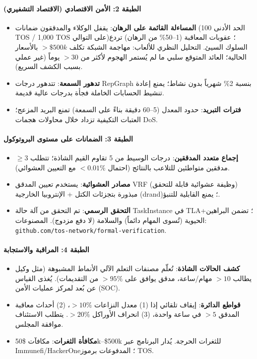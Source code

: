 \documentclass[11pt]{article}
\begin{document}
\paragraph{الطبقة 2: الأمن الاقتصادي (الاقتصاد التشفيري)}
\begin{itemize}[noitemsep]
  \item \textbf{المساءلة القائمة على الرهان}: يقفل الوكلاء والمدققون ضمانات (الحد الأدنى 100 TOS / 1,000 TOS على التوالي)؛ عقوبات المعاقبة (1--50\% من الرهان) تردع السلوك السيئ. التحليل النظري للألعاب: مهاجمة الشبكة تكلف $>\$500k$ بالأسعار الحالية؛ العائد المتوقع سلبي ما لم يُستمر الهجوم لأكثر من $>30$ يوماً (غير عملي بسبب الكشف السريع).
  \item \textbf{تدهور السمعة}: تتدهور درجات RepGraph بنسبة 2\% شهرياً بدون نشاط؛ يمنع إعادة تنشيط الحسابات الخاملة فجأة بدرجات عالية قديمة.
  \item \textbf{فترات التبريد}: حدود المعدل (5--60 دقيقة بناءً على السمعة) تمنع البريد المزعج؛ العتبات التكيفية تزداد خلال محاولات هجمات DoS.
\end{itemize}

\paragraph{الطبقة 3: الضمانات على مستوى البروتوكول}
\begin{itemize}[noitemsep]
  \item \textbf{إجماع متعدد المدققين}: درجات الوسيط من 5 تقاوم القيم الشاذة؛ تتطلب $\geq3$ مدققين متواطئين للتلاعب بالنتائج (احتمال $<0.01\%$ مع التعيين العشوائي).
  \item \textbf{مصادر العشوائية}: يستخدم تعيين المدقق VRF (وظيفة عشوائية قابلة للتحقق) مبذورة بتجزئات الكتل + الإنتروبيا الخارجية (drand)؛ يمنع القابلية للتنبؤ.
  \item \textbf{التحقق الرسمي}: تم التحقق من آلة حالة TaskInstance في TLA+؛ تضمن البراهين الحيوية (تُسوى المهام دائماً) والسلامة (لا دفع مزدوج). المصنوعات: \texttt{github.com/tos-network/formal-verification}.
\end{itemize}

\paragraph{الطبقة 4: المراقبة والاستجابة}
\begin{itemize}[noitemsep]
  \item \textbf{كشف الحالات الشاذة}: تُعلّم مصنفات التعلم الآلي الأنماط المشبوهة (مثل وكيل يطالب $>10$ مهام/ساعة، مدقق يوافق على $>95\%$ من التقديمات). يُغذى القياس عن بُعد لمركز عمليات الأمن (SOC).
  \item \textbf{قواطع الدائرة}: إيقاف تلقائي إذا (1) معدل النزاعات $>10\%$، (2) أحداث معاقبة المدقق $>5$ في ساعة واحدة، (3) انحراف الأوراكل $>20\%$. يتطلب الاستئناف موافقة المجلس.
  \item \textbf{مكافأة الثغرات}: مكافآت \$50k--\$500k للثغرات الحرجة. يُدار البرنامج عبر Immunefi/HackerOne؛ المدفوعات برموز TOS.
\end{itemize}
\end{document}
